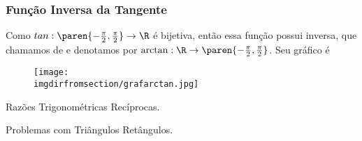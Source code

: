 \subsubsection{Função Inversa da Tangente}

\begin{example}
Como $tan: \paren{- \frac {\pi} 2, \frac {\pi} 2} \to \R$ é
bijetiva, então essa função possui inversa, que chamamos de
 e denotamos por $\arctan : \R \to
\paren{- \frac {\pi} 2, \frac {\pi} 2}$. Seu gráfico é
\begin{figure}
\centering
\texttt{[image: \\imgdirfromsection/grafarctan.jpg]}
\end{figure}
\end{example}

\begin{onlineact}
    {Razões Trigonométricas Recíprocas}.
\end{onlineact}

\begin{onlineact}
    {Problemas com Triângulos Retângulos}.
\end{onlineact}